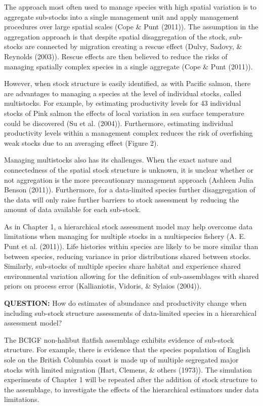 \documentclass[12pt,]{scrartcl}
\begin{document}
The approach most often used to manage species with high spatial
variation is to aggregate sub-stocks into a single management unit and
apply management procedures over large spatial scales (Cope \& Punt
(2011)). The assumption in the aggregation approach is that despite
spatial disaggregation of the stock, sub-stocks are connected by
migration creating a rescue effect (Dulvy, Sadovy, \& Reynolds (2003)).
Rescue effects are then believed to reduce the risks of managing
spatially complex species in a single aggregate (Cope \& Punt (2011)).

However, when stock structure is easily identified, as with Pacific
salmon, there are advantages to managing a species at the level of
individual stocks, called multistocks. For example, by estimating
productivity levels for 43 individual stocks of Pink salmon the effects
of local variation in sea surface temperature could be discovered (Su et
al. (2004)). Furthermore, estimating individual productivity levels
within a management complex reduces the risk of overfishing weak stocks
due to an averaging effect (Figure 2).

Managing multistocks also has its challenges. When the exact nature and
connectedness of the spatial stock structure is unknown, it is unclear
whether or not aggregation is the more precautionary management approach
(Ashleen Julia Benson (2011)). Furthermore, for a data-limited species
further disaggregation of the data will only raise further barriers to
stock assessment by reducing the amount of data available for each
sub-stock.

As in Chapter 1, a hierarchical stock assessment model may help overcome
data limitations when managing for multiple stocks in a multispecies
fishery (A. E. Punt et al. (2011)). Life histories within species are
likely to be more similar than between species, reducing variance in
prior distributions shared between stocks. Similarly, sub-stocks of
multiple species share habitat and experience shared environmental
variation allowing for the definition of sub-assemblages with shared
priors on process error (Kallianiotis, Vidoris, \& Sylaios (2004)).

\textbf{QUESTION:} How do estimates of abundance and productivity change
when including sub-stock structure assessments of data-limited species
in a hierarchical assessment model?

The BCIGF non-halibut flatfish assemblage exhibits evidence of sub-stock
structure. For example, there is evidence that the species population of
English sole on the British Columbia coast is made up of multiple
segregated major stocks with limited migration (Hart, Clemens, \& others
(1973)). The simulation experiments of Chapter 1 will be repeated after
the addition of stock structure to the assemblage, to investigate the
effects of the hierarchical estimators under data limitations.
\end{document}
